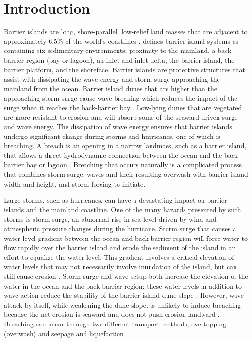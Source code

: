 \documentclass{coastal_paper}
\begin{document}
\section{Introduction}
Barrier islands are long, shore-parallel, low-relief land masses that are adjacent to approximately 6.5\% of the world's coastlines \citep{Oertel1985TheSystem,Stutz2001ADistribution}. \citet{Oertel1985TheSystem} defines barrier island systems as containing six sedimentary environments; proximity to the mainland, a back-barrier region (bay or lagoon), an inlet and inlet delta, the barrier island, the barrier platform, and the shoreface. Barrier islands are protective structures that assist with dissipating the wave energy and storm surge approaching the mainland from the ocean. Barrier island dunes that are higher than the approaching storm surge cause wave breaking which reduces the impact of the surge when it reaches the back-barrier bay \citep{Oertel1985TheSystem, Irish2010}. Low-lying dunes that are vegetated are more resistant to erosion and will absorb some of the seaward driven surge and wave energy. The dissipation of wave energy ensures that barrier islands undergo significant change during storms and hurricanes, one of which is breaching. A breach is an opening in a narrow landmass, such as a barrier island, that allows a direct hydrodynamic connection between the ocean and the back-barrier bay or lagoon \citep{Kraus2003, Wamsley2005CoastalClosure}. Breaching that occurs naturally is a complicated process that combines storm surge, waves and their resulting overwash with barrier island width and height, and storm forcing to initiate. 

Large storms, such as hurricanes, can have a devastating impact on barrier islands and the mainland coastline. One of the many hazards presented by such storms is storm surge, an abnormal rise in sea level driven by wind and atmospheric pressure changes during the hurricane. Storm surge that causes a water level gradient between the ocean and back-barrier region will force water to flow rapidly over the barrier island and erode the sediment of the island in an effort to equalize the water level. This gradient involves a critical elevation of water levels that may not necessarily involve inundation of the island, but can still cause erosion \citep{Kraus2002, Kraus2003}. Storm surge and wave setup both increase the elevation of the water in the ocean and the back-barrier region; these water levels in addition to wave action reduce the stability of the barrier island dune slope \citep{Kraus2003, Kraus2002}. However, wave attack by itself, while weakening the dune slope, is unlikely to induce breaching because the net erosion is seaward and does not push erosion landward \citep{Pierce1970}. Breaching can occur through two different transport methods, overtopping (overwash) and seepage and liquefaction \citep{Kraus2002, Kraus2003}.
\end{document}
